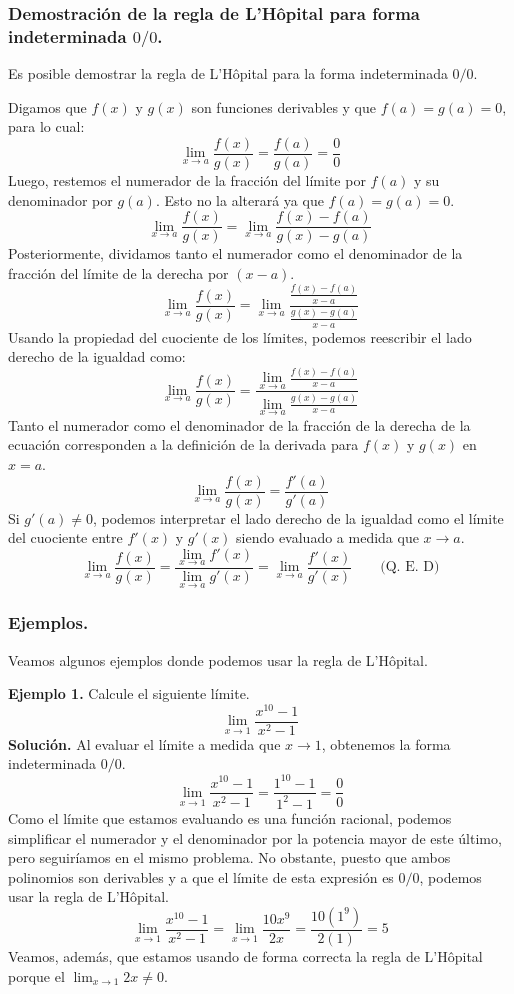 \documentclass[12pt]{article}
\begin{document}
\subsubsection{Demostración de la regla de L'Hôpital para forma indeterminada \texorpdfstring{$0/0$}{0/0}.}

Es posible demostrar la regla de L'Hôpital para la forma indeterminada $0/0$.

Digamos que $f(x)$ y $g(x)$ son funciones derivables y que $f(a) = g(a) = 0$, para lo cual:
\[
  \lim_{x \to a} \frac{f(x)}{g(x)} = \frac{f(a)}{g(a)} = \frac{0}{0}
\]
Luego, restemos el numerador de la fracción del límite por $f(a)$ y su denominador por $g(a)$. Esto no la alterará ya que $f(a) = g(a) = 0$.
\[
  \lim_{x \to a} \frac{f(x)}{g(x)} = \lim_{x \to a} \frac{f(x) - f(a)}{g(x) - g(a)}
\]
Posteriormente, dividamos tanto el numerador como el denominador de la fracción del límite de la derecha por $(x - a)$.
\[
  \lim_{x \to a} \frac{f(x)}{g(x)} = \lim_{x \to a} \frac{\displaystyle \frac{f(x) - f(a)}{x - a}}{\displaystyle \frac{g(x) - g(a)}{x - a}}
\]
Usando la propiedad del cuociente de los límites, podemos reescribir el lado derecho de la igualdad como:
\[
  \lim_{x \to a} \frac{f(x)}{g(x)} = \frac{\displaystyle \lim_{x \to a} \frac{f(x) - f(a)}{x - a}}{\displaystyle \lim_{x \to a} \frac{g(x) - g(a)}{x - a}}
\]
Tanto el numerador como el denominador de la fracción de la derecha de la ecuación corresponden a la definición de la derivada para $f(x)$ y $g(x)$ en $x = a$.
\[
  \lim_{x \to a} \frac{f(x)}{g(x)} = \frac{f'(a)}{g'(a)}
\]
Si $g'(a) \neq 0$, podemos interpretar el lado derecho de la igualdad como el límite del cuociente entre $f'(x)$ y $g'(x)$ siendo evaluado a medida que $x \to a$.
\[
  \lim_{x \to a} \frac{f(x)}{g(x)} = \frac{\displaystyle \lim_{x \to a} f'(x)}{\displaystyle \lim_{x \to a} g'(x)}
                                   = \lim_{x \to a} \frac{f'(x)}{g'(x)} \qquad \text{(Q. E. D)}
\]

\subsubsection{Ejemplos.}

Veamos algunos ejemplos donde podemos usar la regla de L'Hôpital.

\textbf{Ejemplo 1.} Calcule el siguiente límite.
\[
  \lim_{x \to 1} \frac{x^{10} - 1}{x^{2} - 1}
\]
\textbf{Solución.} Al evaluar el límite a medida que $x \to 1$, obtenemos la forma indeterminada $0/0$.
\[
  \lim_{x \to 1} \frac{x^{10} - 1}{x^{2} - 1} = \frac{1^{10} - 1}{1^{2} - 1} = \frac{0}{0}
\]
Como el límite que estamos evaluando es una función racional, podemos simplificar el numerador y el denominador por la potencia mayor de este último, pero seguiríamos en el mismo problema. No obstante, puesto que ambos polinomios son derivables y a que el límite de esta expresión es $0/0$, podemos usar la regla de L'Hôpital.
\[
  \lim_{x \to 1} \frac{x^{10} - 1}{x^{2} - 1} = \lim_{x \to 1} \frac{10x^{9}}{2x} = \frac{10(1^{9})}{2(1)} = 5
\]
Veamos, además, que estamos usando de forma correcta la regla de L'Hôpital porque el $\lim_{x \to 1} 2x \neq 0$.
\end{document}
